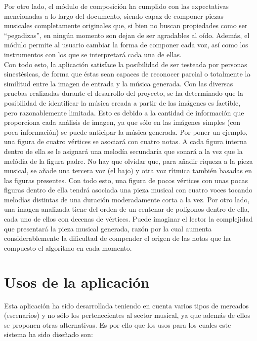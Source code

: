 Por otro lado, el módulo de composición ha cumplido con las expectativas mencionadas a lo largo del documento, siendo capaz de componer piezas musicales completamente originales que, si bien no buscan propiedades como ser ``pegadizas'', en ningún momento son dejan de ser agradables al oído. Además, el módulo permite al usuario cambiar la forma de componer cada voz, así como los instrumentos con los que se interpretará cada una de ellas.\\

Con todo esto, la aplicación satisface la posibilidad de ser testeada por personas sinestésicas, de forma que éstas sean capaces de reconocer parcial o totalmente la similitud entre la imagen de entrada y la música generada. Con las diversas pruebas realizadas durante el desarrollo del proyecto, se ha determinado que la posibilidad de identificar la música creada a partir de las imágenes es factible, pero razonablemente limitada. Esto es debido a la cantidad de información que proporciona cada análisis de imagen, ya que sólo en las imágenes simples (con poca información) se puede anticipar la música generada. \color{blue}Por poner un ejemplo, una figura de cuatro vértices se asociará con cuatro notas. A cada figura interna dentro de ella se le asignará una melodía secundaría que sonará a la vez que la melódia de la figura padre. No hay que olvidar que, para añadir riqueza a la pieza musical, se añade una tercera voz (el bajo) y otra voz rítmica también basadas en las figuras presentes. Con todo esto, una figura de pocos vértices con unas pocas figuras dentro de ella tendrá asociada una pieza musical con cuatro voces tocando melodías distintas de una duración moderadamente corta a la vez. Por otro lado, una imagen analizada tiene del orden de un centenar de polígonos dentro de ella, cada uno de ellos con decenas de vértices. Puede imaginar el lector la complejidad que presentará la pieza musical generada, razón por la cual aumenta considerablemente la dificultad de compender el origen de las notas que ha compuesto el algoritmo en cada momento.\color{black}\\


\section{Usos de la aplicación}
\label{sec:usos}

Esta aplicación ha sido desarrollada teniendo en cuenta varios tipos de mercados (escenarios) y no sólo los pertenecientes al sector musical, ya que además de ellos se proponen otras alternativas. Es por ello que los usos para los cuales este sistema ha sido diseñado son:

